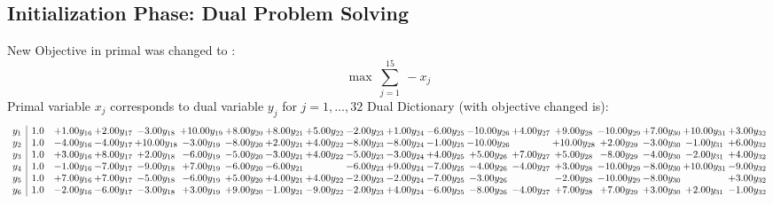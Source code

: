 \documentclass[9pt]{article}
\begin{document}
\subsection{Initialization Phase: Dual Problem Solving}
New Objective in primal was changed to : \[ \max\ \sum_{j=1}^{15}\ - x_j \] 
Primal variable $x_j$ corresponds to dual variable $y_j$ for $j = 1,\ldots,32$
Dual Dictionary (with objective changed is): 
\[\begin{array}{c| c c@{\hskip 2pt} c@{\hskip 2pt} c@{\hskip 2pt} c@{\hskip 2pt} c@{\hskip 2pt} c@{\hskip 2pt} c@{\hskip 2pt} c@{\hskip 2pt} c@{\hskip 2pt} c@{\hskip 2pt} c@{\hskip 2pt} c@{\hskip 2pt} c@{\hskip 2pt} c@{\hskip 2pt} c@{\hskip 2pt} c@{\hskip 2pt} c@{\hskip 2pt} }
 y_{1}   &  1.0 & +  1.00 y_{16} & +  2.00 y_{17} & -3.00 y_{18} & + 10.00 y_{19} & +  8.00 y_{20} & +  8.00 y_{21} & +  5.00 y_{22} & -2.00 y_{23} & +  1.00 y_{24} & -6.00 y_{25} & -10.00 y_{26} & +  4.00 y_{27} & +  9.00 y_{28} & -10.00 y_{29} & +  7.00 y_{30} & + 10.00 y_{31} & +  3.00 y_{32}\\
 y_{2}   &  1.0 & -4.00 y_{16} & -4.00 y_{17} & + 10.00 y_{18} & -3.00 y_{19} & -8.00 y_{20} & +  2.00 y_{21} & +  4.00 y_{22} & -8.00 y_{23} & -8.00 y_{24} & -1.00 y_{25} & -10.00 y_{26} &   & + 10.00 y_{28} & +  2.00 y_{29} & -3.00 y_{30} & -1.00 y_{31} & +  6.00 y_{32}\\
 y_{3}   &  1.0 & +  3.00 y_{16} & +  8.00 y_{17} & +  2.00 y_{18} & -6.00 y_{19} & -5.00 y_{20} & -3.00 y_{21} & +  4.00 y_{22} & -5.00 y_{23} & -3.00 y_{24} & +  4.00 y_{25} & +  5.00 y_{26} & +  7.00 y_{27} & +  5.00 y_{28} & -8.00 y_{29} & -4.00 y_{30} & -2.00 y_{31} & +  4.00 y_{32}\\
 y_{4}   &  1.0 & -1.00 y_{16} & -7.00 y_{17} & -9.00 y_{18} & +  7.00 y_{19} & -6.00 y_{20} & -6.00 y_{21} &   & -6.00 y_{23} & +  9.00 y_{24} & -7.00 y_{25} & -4.00 y_{26} & -4.00 y_{27} & +  3.00 y_{28} & -10.00 y_{29} & -8.00 y_{30} & + 10.00 y_{31} & -9.00 y_{32}\\
 y_{5}   &  1.0 & +  7.00 y_{16} & +  7.00 y_{17} & -5.00 y_{18} & -6.00 y_{19} & +  5.00 y_{20} & +  4.00 y_{21} & +  4.00 y_{22} & -2.00 y_{23} & -2.00 y_{24} & -7.00 y_{25} & -3.00 y_{26} &   & -2.00 y_{28} & -10.00 y_{29} & -8.00 y_{30} &   & +  3.00 y_{32}\\
 y_{6}   &  1.0 & -2.00 y_{16} & -6.00 y_{17} & -3.00 y_{18} & +  3.00 y_{19} & +  9.00 y_{20} & -1.00 y_{21} & -9.00 y_{22} & -2.00 y_{23} & +  4.00 y_{24} & -6.00 y_{25} & -8.00 y_{26} & -4.00 y_{27} & +  7.00 y_{28} & +  7.00 y_{29} & +  3.00 y_{30} & +  2.00 y_{31} & -1.00 y_{32}\\

\end{array}\]
\end{document}
